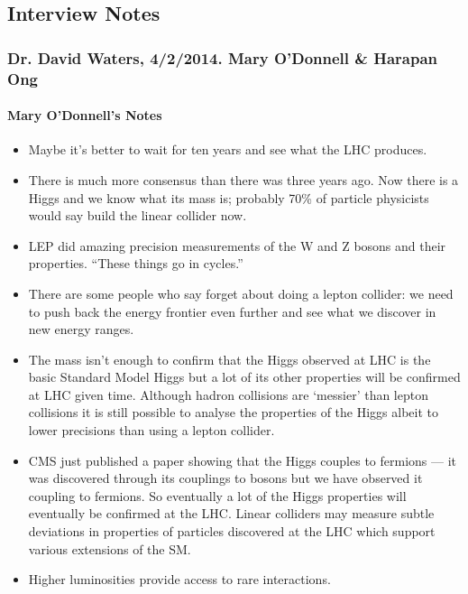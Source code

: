 \subsection{Interview Notes}
\subsubsection{Dr. David Waters, 4/2/2014. Mary O'Donnell \& Harapan Ong}
\label{interview:waters}
\paragraph{Mary O'Donnell's Notes}
\begin{itemize}
\item Maybe it's better to wait for ten years and see what the LHC produces.

\item There is much more consensus than there was three years ago. Now there is a Higgs and we know what its mass is; probably 70\% of particle physicists would say build the linear collider now.

\item LEP did amazing precision measurements of the W and Z bosons and their properties. ``These things go in cycles.''

\item There are some people who say forget about doing a lepton collider: we need to push back the energy frontier even further and see what we discover in new energy ranges.

\item The mass isn't enough to confirm that the Higgs observed at LHC is the basic Standard Model Higgs but a lot of its other properties will be confirmed at LHC given time. Although hadron collisions are `messier' than lepton collisions it is still possible to analyse the properties of the Higgs albeit to lower precisions than using a lepton collider.

\item CMS just published a paper showing that the Higgs couples to fermions — it was discovered through its couplings to bosons but we have observed it coupling to fermions. So eventually a lot of the Higgs properties will eventually be confirmed at the LHC.
Linear colliders may measure subtle deviations in properties of particles discovered at the LHC which support various extensions of the SM.

\item Higher luminosities provide access to rare interactions.


\end{itemize}
